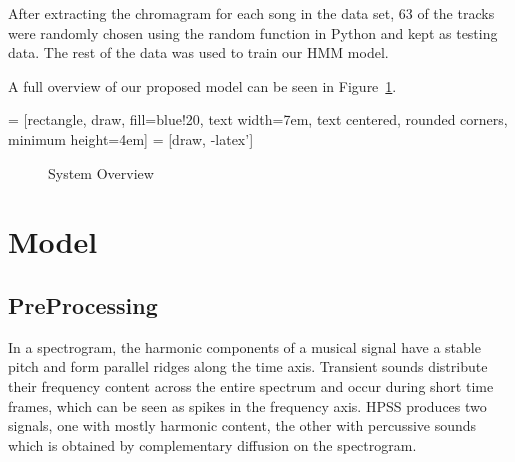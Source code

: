 \documentclass{article}
\begin{document}
After extracting the chromagram for each song in the data set, 63 of the tracks
were randomly chosen using the random function in Python and kept as testing
data. The rest of the data was used to train our HMM model.

A full overview of our proposed model can be seen in Figure~\ref{fig:overview}.

 = [rectangle, draw, fill=blue!20,
    text width=7em, text centered, rounded corners, minimum height=4em]
 = [draw, -latex']

\begin{figure}
\caption{System Overview}
\label{fig:overview}
\end{figure}

\section{Model}

\subsection{PreProcessing}

In a spectrogram, the harmonic components of a musical signal have a stable
pitch and form parallel ridges along the time axis. Transient sounds distribute
their frequency content across the entire spectrum and occur during short time
frames, which can be seen as spikes in the frequency axis.  HPSS produces two
signals, one with mostly harmonic content, the other with percussive sounds
which is obtained by complementary diffusion on the spectrogram.
\end{document}
